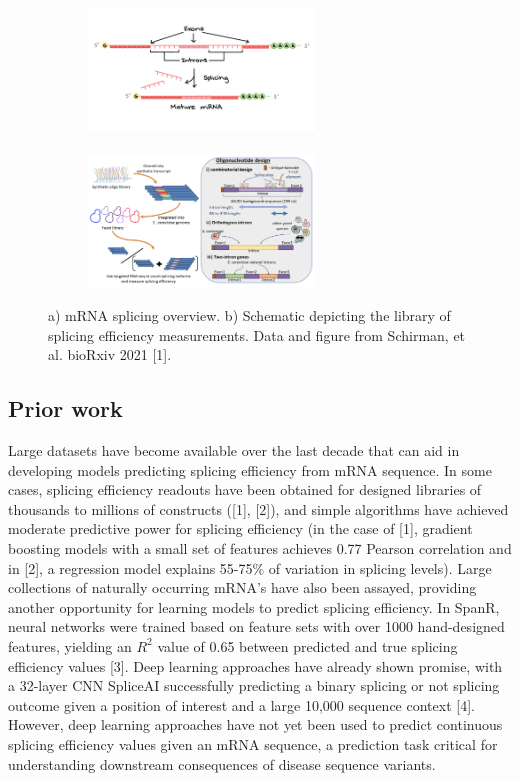 \documentclass[10.5pt]{article}
\begin{document}
\begin{figure}[H]
\centering
\begin{subfigure}{.4 \textwidth}
\centering
\caption{} \includegraphics[width=6cm]{splicing_graphic.png} 
\label{fig:splicing}
\end{subfigure}
\begin{subfigure}{.5 \textwidth}
\centering
\caption{}  \includegraphics[width=6cm]{dataset_overview_pilpel.png} 
\label{fig:dataset}
\end{subfigure}
\caption{a) mRNA splicing overview. b) Schematic depicting the library of splicing efficiency measurements. Data and figure from Schirman, et al. bioRxiv 2021 [1].}
\end{figure}
\subsection{Prior work}
Large datasets have become available over the last decade that can aid in developing models predicting splicing efficiency from mRNA sequence. In some cases, splicing efficiency readouts have been obtained for designed libraries of thousands to millions of constructs ([1], [2]), and simple algorithms have achieved moderate predictive power for splicing efficiency (in the case of [1], gradient boosting models with a small set of features achieves 0.77 Pearson correlation and in [2], a regression model explains 55-75\% of variation in splicing levels). Large collections of naturally occurring mRNA's have also been assayed, providing another opportunity for learning models to predict splicing efficiency. In SpanR, neural networks were trained based on feature sets with over 1000 hand-designed features, yielding an $R^2$ value of 0.65 between predicted and true splicing efficiency values [3]. Deep learning approaches have already shown promise, with a 32-layer CNN SpliceAI successfully predicting a binary splicing or not splicing outcome given a position of interest and a large 10,000 sequence context [4]. However, deep learning approaches have not yet been used to predict continuous splicing efficiency values given an mRNA sequence, a prediction task critical for understanding downstream consequences of disease sequence variants.
\end{document}
